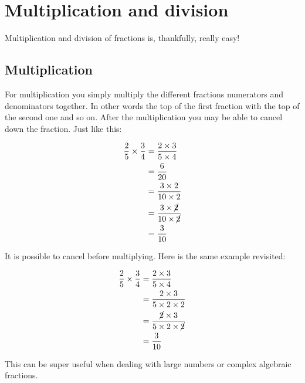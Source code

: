 \documentclass[
  a4paper,
]{scrbook}
\begin{document}
\section{Multiplication and
division}\label{multiplication-and-division-1}

Multiplication and division of fractions is, thankfully, really easy!

\subsection{Multiplication}\label{multiplication}

For multiplication you simply multiply the different fractions
numerators and denominators together. In other words the top of the
first fraction with the top of the second one and so on. After the
multiplication you may be able to cancel down the fraction. Just like
this:

\[
\begin{aligned} \frac{2}{5} \times \frac{3}{4} &= \frac{2 \times 3}{5 \times 4} \\
&= \frac{6}{20} \\
&= \frac{3 \times 2}{10 \times 2} \\
&= \frac{3 \times \cancel{2}}{10 \times \cancel{2}} \\
&= \frac{3}{10}
\end{aligned}
\]

\begin{tcolorbox}[enhanced jigsaw, arc=.35mm, bottomrule=.15mm, bottomtitle=1mm, breakable, colback=white, colbacktitle=quarto-callout-tip-color!10!white, colframe=quarto-callout-tip-color-frame, coltitle=black, left=2mm, leftrule=.75mm, opacityback=0, opacitybacktitle=0.6, rightrule=.15mm, title=\textcolor{quarto-callout-tip-color}{\faLightbulb}\hspace{0.5em}{Pro-tip}, titlerule=0mm, toprule=.15mm, toptitle=1mm]

It is possible to cancel before multiplying. Here is the same example
revisited:

\[
\begin{aligned} \frac{2}{5} \times \frac{3}{4} &= \frac{2 \times 3}{5 \times 4} \\
&= \frac{2 \times 3}{5 \times 2 \times 2} \\
&= \frac{\cancel{2} \times 3}{5 \times 2 \times \cancel{2}} \\
&= \frac{3}{10}
\end{aligned}
\]

This can be super useful when dealing with large numbers or complex
algebraic fractions.

\end{tcolorbox}
\end{document}
